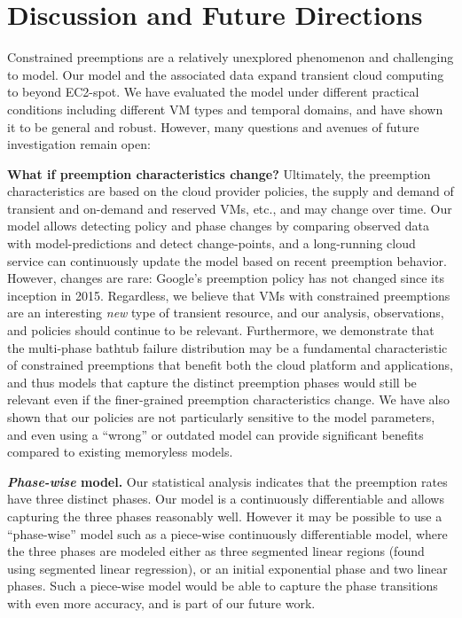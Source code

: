 \vspace*{\subsecspace}
\section{Discussion and Future Directions}
\label{sec:discussion}


Constrained preemptions are a relatively unexplored phenomenon and challenging to model.
Our model and the associated data expand transient cloud computing to beyond EC2-spot.
We have evaluated the model under different practical conditions including different VM types and temporal domains, and have shown it to be general and robust. 
However, many questions and avenues of future investigation remain open:

\noindent \textbf{What if preemption characteristics change?}
Ultimately, the preemption characteristics are based on the cloud provider policies, the supply and demand of transient and on-demand and reserved VMs, etc., and may change over time.  
Our model allows detecting policy and phase changes by comparing observed data with model-predictions and detect change-points, and 
a long-running cloud service can continuously update the model based on recent preemption behavior. 
However, changes are rare: Google's preemption policy has not changed since its inception in 2015.
%
Regardless, we believe that VMs with constrained preemptions are an interesting \emph{new} type of transient resource, and our analysis, observations, and policies should continue to be relevant. 
Furthermore, we demonstrate that the multi-phase bathtub failure distribution may be a fundamental characteristic of constrained preemptions that benefit both the cloud platform and applications, and thus models that capture the distinct preemption phases would still be relevant even if the finer-grained preemption characteristics change. %
%
We have also shown that our policies are not particularly sensitive to the model parameters, and even using a ``wrong'' or outdated model can provide significant benefits compared to existing memoryless models. 

\noindent \textbf{\emph{Phase-wise} model.}
Our statistical analysis indicates that the preemption rates have three distinct phases. 
Our model is a continuously differentiable and allows capturing the three phases reasonably well. 
However it may be possible to use a ``phase-wise'' model such as a piece-wise continuously differentiable model, where the three phases are modeled either as three segmented linear regions (found using segmented linear regression), or an initial exponential phase and two linear phases. 
Such a piece-wise model would be able to capture the phase transitions with even more accuracy, and is part of our future work. 

